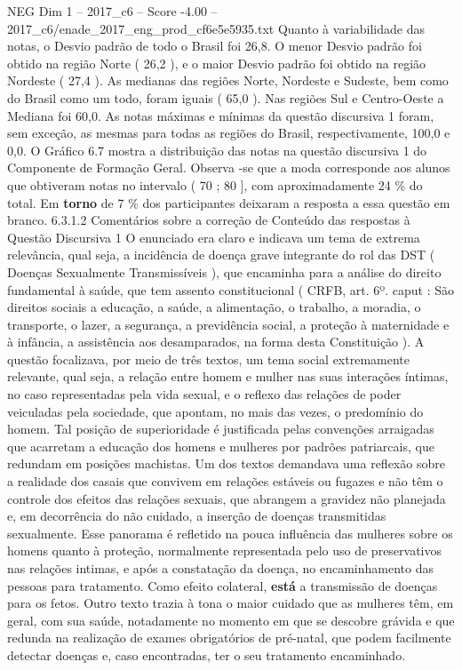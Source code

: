 \begin{textsample}{NEG Dim 1 – 2017\_c6 – Score -4.00 – 2017\_c6/enade\_2017\_eng\_prod\_cf6e5e5935.txt}
Quanto à variabilidade das notas, o Desvio padrão de todo o Brasil foi 26,8.
O menor Desvio padrão foi obtido na região Norte ( 26,2 ), e o maior Desvio padrão foi obtido na região Nordeste ( 27,4 ).
As medianas das regiões Norte, Nordeste e Sudeste, bem como do Brasil como um todo, foram iguais ( 65,0 ).
Nas regiões Sul e Centro-Oeste a Mediana foi 60,0.
As notas máximas e mínimas da questão discursiva 1 foram, sem exceção, as mesmas para todas as regiões do Brasil, respectivamente, 100,0 e 0,0.
O Gráfico 6.7 mostra a distribuição das notas na questão discursiva 1 do Componente de Formação Geral.
Observa -se que a moda corresponde aos alunos que obtiveram notas no intervalo ( 70 ; 80 ], com aproximadamente 24 \% do total.
Em \textbf{torno} de 7 \% dos participantes deixaram a resposta a essa questão em branco. 6.3.1.2 Comentários sobre a correção de Conteúdo das respostas à Questão Discursiva 1 O enunciado era claro e indicava um tema de extrema relevância, qual seja, a incidência de doença grave integrante do rol das DST ( Doenças Sexualmente Transmissíveis ), que encaminha para a análise do direito fundamental à saúde, que tem assento constitucional ( CRFB, art. 6º. caput : São direitos sociais a educação, a saúde, a alimentação, o trabalho, a moradia, o transporte, o lazer, a segurança, a previdência social, a proteção à maternidade e à infância, a assistência aos desamparados, na forma desta Constituição ).
A questão focalizava, por meio de três textos, um tema social extremamente relevante, qual seja, a relação entre homem e mulher nas suas interações íntimas, no caso representadas pela vida sexual, e o reflexo das relações de poder veiculadas pela sociedade, que apontam, no mais das vezes, o predomínio do homem.
Tal posição de superioridade é justificada pelas convenções arraigadas que acarretam a educação dos homens e mulheres por padrões patriarcais, que redundam em posições machistas.
Um dos textos demandava uma reflexão sobre a realidade dos casais que convivem em relações estáveis ou fugazes e não têm o controle dos efeitos das relações sexuais, que abrangem a gravidez não planejada e, em decorrência do não cuidado, a inserção de doenças transmitidas sexualmente.
Esse panorama é refletido na pouca influência das mulheres sobre os homens quanto à proteção, normalmente representada pelo uso de preservativos nas relações intimas, e após a constatação da doença, no encaminhamento das pessoas para tratamento.
Como efeito colateral, \textbf{está} a transmissão de doenças para os fetos.
Outro texto trazia à tona o maior cuidado que as mulheres têm, em geral, com sua saúde, notadamente no momento em que se descobre grávida e que redunda na realização de exames obrigatórios de pré-natal, que podem facilmente detectar doenças e, caso encontradas, ter o seu tratamento encaminhado.

\end{textsample}
